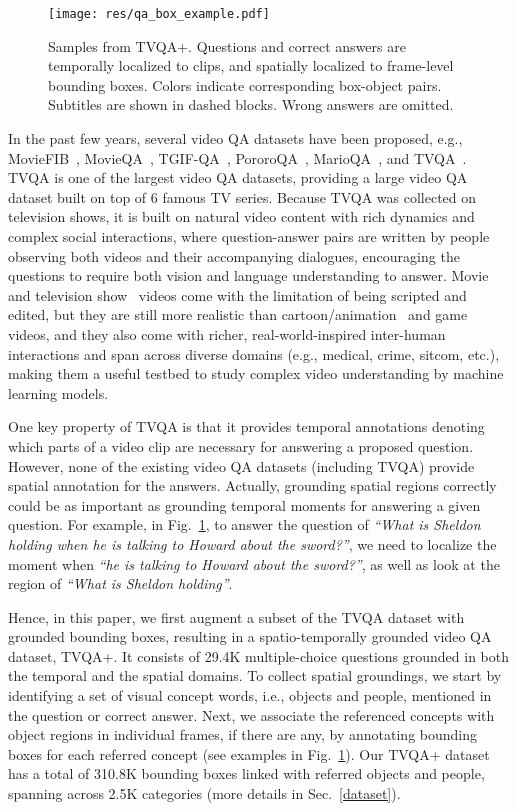 \documentclass[11pt,a4paper]{article}
\begin{document}
\begin{figure}[!t]
  \centering
  \texttt{[image: res/qa\_box\_example.pdf]}
  \caption{Samples from TVQA+. Questions and correct answers are temporally localized to clips, and spatially localized to frame-level bounding boxes. Colors indicate corresponding box-object pairs. Subtitles are shown in dashed blocks. Wrong answers are omitted.}
  \label{fig:qa_box_example}
\end{figure}

In the past few years, several video QA datasets have been proposed, e.g., MovieFIB~\cite{Maharaj2017ADA}, MovieQA~\cite{Tapaswi2016MovieQAUS}, TGIF-QA~\cite{Jang2017TGIFQATS}, PororoQA~\cite{Kim2017DeepStoryVS}, MarioQA~\cite{mun2017marioQA}, and TVQA~\cite{lei2018tvqa}.
TVQA is one of the largest video QA datasets, providing a large video QA dataset built on top of 6 famous TV series. 
Because TVQA was collected on television shows, it is built on natural video content with rich dynamics and complex social interactions, where question-answer pairs are written by people observing both videos and their accompanying dialogues, encouraging the questions to require both vision and language understanding to answer. 
Movie~\cite{Tapaswi2016MovieQAUS,Maharaj2017ADA} and television show~\cite{lei2018tvqa} videos come with the limitation of being scripted and edited, but they are still more realistic than cartoon/animation~\cite{Kim2017DeepStoryVS} and game~\cite{mun2017marioQA} videos, and they also come with richer, real-world-inspired inter-human interactions and span across diverse domains (e.g., medical, crime, sitcom, etc.), making them a useful testbed to study complex video understanding by machine learning models.


One key property of TVQA is that it provides temporal annotations denoting which parts of a video clip are necessary for answering a proposed question.
However, none of the existing video QA datasets (including TVQA) provide spatial annotation for the answers.
Actually, grounding spatial regions correctly could be as important as grounding temporal moments for answering a given question.
For example, in Fig.~\ref{fig:qa_box_example}, to answer the question of \textit{``What is Sheldon holding when he is talking to Howard about the sword?''}, we need to localize the moment when \textit{``he is talking to Howard about the sword?''}, as well as look at the region of \textit{``What is Sheldon holding''}.

Hence, in this paper, we first augment a subset of the TVQA dataset with grounded bounding boxes, resulting in a spatio-temporally grounded video QA dataset, TVQA+.
It consists of 29.4K multiple-choice questions grounded in both the temporal and the spatial domains.
To collect spatial groundings, we start by identifying a set of visual concept words, i.e., objects and people, mentioned in the question or correct answer. 
Next, we associate the referenced concepts with object regions in individual frames, if there are any, by annotating bounding boxes for each referred concept (see examples in Fig.~\ref{fig:qa_box_example}). 
Our TVQA+ dataset has a total of 310.8K bounding boxes linked with referred objects and people, spanning across 2.5K categories (more details in Sec.~\ref{dataset}).
\end{document}

